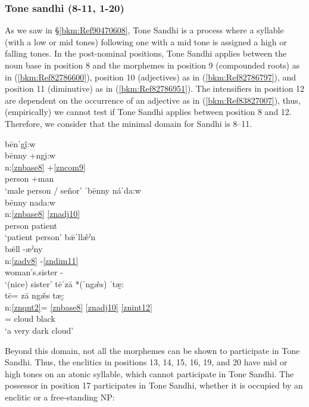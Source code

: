 \documentclass[output=paper]{langscibook}
\begin{document}
\subsubsection{  Tone sandhi (8-11, 1-20)}\label{bkm:Ref106960089}
As we saw in §\ref{bkm:Ref90470608}, Tone Sandhi is a process where a syllable (with a low or mid tones) following one with a mid tone is assigned a high or falling tones. In the post-nominal positions, Tone Sandhi applies between the noun base in position 8 and the morphemes in position 9 (compounded roots) as in (\ref{bkm:Ref82786600}), position 10 (adjectives) as in (\ref{bkm:Ref82786797}), and position 11 (diminutive) as in (\ref{bkm:Ref82786951}). The intensifiers in position 12 are dependent on the occurrence of an adjective as in (\ref{bkm:Ref83827007}), thus, (empirically) we cannot test if Tone Sandhi applies between position 8 and 12. Therefore, we consider that the minimal domain for Sandhi is 8--11.

\ea\label{bkm:Ref82786600}
{bēnˈgḭ̂:w}\\
\glll bēnny +ngḭ:w\\
n:\ref{znbase8} +\ref{zncom9} \\
person +man\\
\glt `male person / señor'
\ex\label{bkm:Ref82786797}
{ˈbēnny náˈda:w}\\
\glll bēnny nada:w\\
n:\ref{znbase8}  \ref{znadj10}\\
person patient\\
\glt `patient person'
\ex\label{bkm:Ref82786951}
{b\={æ}ˈll\^{æ}ˀn}\\
\glll b\={æ}ll -æˀny\\
n:\ref{zadv8}  -\ref{zndim11}\\
woman's.sister -\Dim{}\\
\glt `(nice) sister'
\ex\label{bkm:Ref83827007}
{tēˈzā *(ˈng\v{æ}s) ˈtæ̰:}\\
\glll tē= zā ng\v{æ}s tæ:̰\\
n:\ref{znqnt2}= \ref{znbase8} \ref{znadj10} \ref{znint12}\\
\Indf{}= cloud black \Intens{}\\
\glt `a very dark cloud'
\z

Beyond this domain, not all the morphemes can be shown to participate in Tone Sandhi. Thus, the enclitics in positions 13, 14, 15, 16, 19, and 20 have mid or high tones on an atonic syllable, which cannot participate in Tone Sandhi. The possessor in position 17 participates in Tone Sandhi, whether it is occupied by an enclitic or a free-standing NP: 
\end{document}
